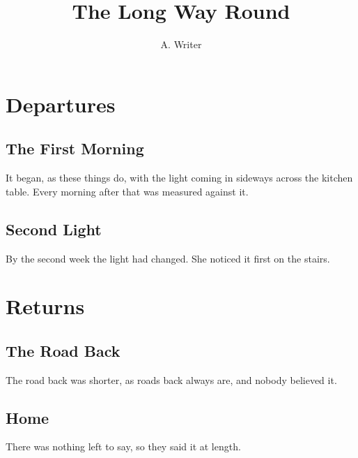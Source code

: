 \documentclass{book}
\title{The Long Way Round}
\author{A. Writer}
\begin{document}
\frontmatter
\maketitle
\tableofcontents
\mainmatter
\part{Departures}
\chapter{The First Morning}
It began, as these things do, with the light coming in sideways across the kitchen table.
Every morning after that was measured against it.

\chapter{Second Light}
By the second week the light had changed. She noticed it first on the stairs.

\part{Returns}
\chapter{The Road Back}
The road back was shorter, as roads back always are, and nobody believed it.

\chapter{Home}
There was nothing left to say, so they said it at length.
\end{document}
